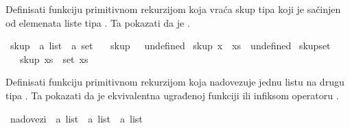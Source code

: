 \begin{isabellebody}
\begin{exercise}[subtitle=Algebarski tip podataka: lista.]
\begin{isamarkuptext}
\end{isamarkuptext}\isamarkuptrue%
%
\begin{isamarkuptext}%
Definisati funkciju  primitivnom rekurzijom
      koja vraća skup tipa  koji je sačinjen od elemenata liste tipa .
      Ta pokazati da je .%
\end{isamarkuptext}\isamarkuptrue%
\isamarkupfalse%
\ skup\ {\isacharcolon}{\kern0pt}{\isacharcolon}{\kern0pt}\ {\isachardoublequoteopen}{\isacharprime}{\kern0pt}a\ list\ {\isasymRightarrow}\ {\isacharprime}{\kern0pt}a\ set{\isachardoublequoteclose}\ \isanewline
\ \ {\isachardoublequoteopen}skup\ {\isacharbrackleft}{\kern0pt}{\isacharbrackright}{\kern0pt}\ {\isacharequal}{\kern0pt}\ undefined{\isachardoublequoteclose}\isanewline
{\isacharbar}{\kern0pt}\ {\isachardoublequoteopen}skup\ {\isacharparenleft}{\kern0pt}x\ {\isacharhash}{\kern0pt}\ xs{\isacharparenright}{\kern0pt}\ {\isacharequal}{\kern0pt}\ undefined{\isachardoublequoteclose}\isanewline
\isanewline
{}\isamarkupfalse%
\ skup{\isacharunderscore}{\kern0pt}set{\isacharcolon}{\kern0pt}\isanewline
\ \ \ {\isachardoublequoteopen}skup\ xs\ {\isacharequal}{\kern0pt}\ set\ xs{\isachardoublequoteclose}\isanewline
\ \ %
\isadelimproof
%
\endisadelimproof
%
\isatagproof
%
\endisatagproof
{\isafoldproof}%
%
\isadelimproof
%
\endisadelimproof
%
\begin{isamarkuptext}%
Definisati funkciju  primitivnom rekurzijom
      koja nadovezuje jednu listu na drugu tipa .
      Ta pokazati da je ekvivalentna ugrađenoj funkciji  
      ili infiksom operatoru \isa{{\isacharat}{\kern0pt}}.%
\end{isamarkuptext}\isamarkuptrue%
\isamarkupfalse%
\ nadovezi\ {\isacharcolon}{\kern0pt}{\isacharcolon}{\kern0pt}\ {\isachardoublequoteopen}{\isacharprime}{\kern0pt}a\ list\ {\isasymRightarrow}\ {\isacharprime}{\kern0pt}a\ list\ {\isasymRightarrow}\ {\isacharprime}{\kern0pt}a\ list{\isachardoublequoteclose}\ \isanewline

\end{exercise}
\end{isabellebody}
